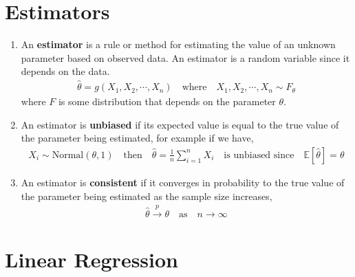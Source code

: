\documentclass[letterpaper, 11pt]{article}
\newcommand{\converge}[1][]{\xrightarrow{#1}}
\newcommand{\E}{\mathbb{E}}	%
\newcommand{\1}{\mathds{1}}	%
\theoremstyle{definition}
\begin{document}
\section{Estimators}
\begin{enumerate}
    \item An \textbf{estimator} is a rule or method for estimating the value of an unknown parameter based on observed data. An estimator is a random variable since it depends on the data.
    \begin{align}
        \hat{\theta} = g(X_1, X_2, \cdots, X_n) \quad \text{where} \quad X_1, X_2, \cdots, X_n \sim F_{\theta}
    \end{align}
    where $F$ is some distribution that depends on the parameter $\theta$.
    \item An estimator is \textbf{unbiased} if its expected value is equal to the true value of the parameter being estimated, for 
    example if we have,
    \begin{align}
        X_i \sim \text{Normal}(\theta, 1) \quad \text{then} \quad \hat{\theta} = \frac{1}{n} \sum_{i=1}^{n} X_i \quad \text{is unbiased since} \quad \E[\hat{\theta}] = \theta
    \end{align}
    \item An estimator is \textbf{consistent} if it converges in probability to the true value of the parameter being estimated as the sample size increases,
    \begin{align}
        \hat{\theta} \converge[p] \theta \quad \text{as} \quad n \to \infty
    \end{align}

\end{enumerate}



\section{Linear Regression}
\end{document}
